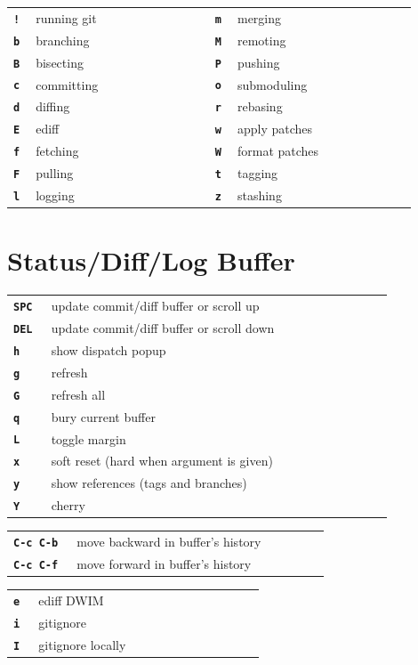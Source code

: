 \documentclass[9pt]{extarticle} %
\begin{document}
\begin{multicols}{3}
  \begin{tabular}{L{0.05\linewidth} L{0.40\linewidth} L{0.05\linewidth} L{0.40\linewidth}}
    \tt \textbf{!} & running git & \tt \textbf{m} & merging \\
    \tt \textbf{b} & branching & \tt \textbf{M} & remoting \\
    \tt \textbf{B} & bisecting & \tt \textbf{P} & pushing \\
    \tt \textbf{c} & committing & \tt \textbf{o} & submoduling \\
    \tt \textbf{d} & diffing & \tt \textbf{r} & rebasing \\
    \tt \textbf{E} & ediff & \tt \textbf{w} & apply patches \\
    \tt \textbf{f} & fetching & \tt \textbf{W} & format patches \\
    \tt \textbf{F} & pulling & \tt \textbf{t} & tagging \\
    \tt \textbf{l} & logging & \tt \textbf{z} & stashing
  \end{tabular}

  \vspace{5ex}

  \section*{Status/Diff/Log Buffer}

  \begin{tabular}{L{0.10\linewidth} L{0.90\linewidth}}
    \tt \textbf{SPC} & update commit/diff buffer or scroll up \\
    \tt \textbf{DEL} & update commit/diff buffer or scroll down \\
    \tt \textbf{h} & show dispatch popup \\
    \tt \textbf{g} & refresh \\
    \tt \textbf{G} & refresh all \\
    \tt \textbf{q} & bury current buffer \\
    \tt \textbf{L} & toggle margin \\
    \tt \textbf{x} & soft reset (hard when argument is given) \\
    \tt \textbf{y} & show references (tags and branches) \\
    \tt \textbf{Y} & cherry
  \end{tabular}
  \begin{tabular}{L{0.20\linewidth} L{0.80\linewidth}}
    \tt \textbf{C-c C-b} & move backward in buffer's history \\
    \tt \textbf{C-c C-f} & move forward in buffer's history
  \end{tabular}
  \begin{tabular}{L{0.10\linewidth} L{0.90\linewidth}}
    \tt \textbf{e} & ediff DWIM \\
    \tt \textbf{i} & gitignore \\
    \tt \textbf{I} & gitignore locally
  \end{tabular}


\end{multicols}
\end{document}
